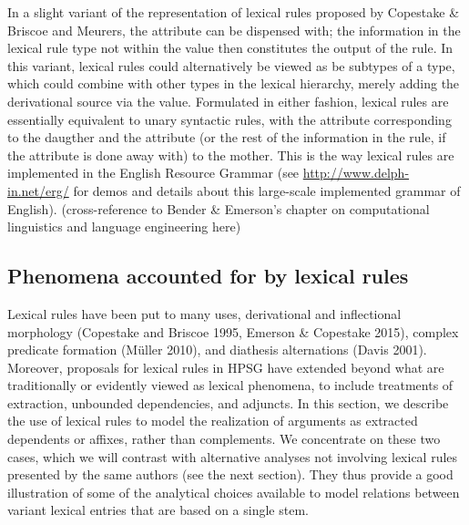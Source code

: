 \documentclass[output=paper]{langsci/langscibook}
\begin{document}
In a slight variant of the representation of lexical rules proposed by Copestake \& Briscoe and Meurers, the  attribute can be dispensed with; the information in the lexical rule type not within the  value then constitutes the output of the rule.
In this variant, lexical rules could alternatively be viewed as be subtypes of a  type, which could combine with other types in the lexical hierarchy, merely adding the derivational source via the  value. 
Formulated in either fashion, lexical rules are essentially equivalent to unary syntactic rules, with the  attribute corresponding to the daugther and the  attribute (or the rest of the information in the rule, if the  attribute is done away with) to the mother. This is the way lexical rules are implemented in the English Resource Grammar (see \url{http://www.delph-in.net/erg/} for demos and details about this large-scale implemented grammar of English). (cross-reference to Bender \& Emerson's chapter on computational linguistics and language engineering here)


	\subsection{Phenomena accounted for by lexical rules}

Lexical rules have been put to many uses, derivational and inflectional morphology (Copestake and Briscoe 1995, Emerson \& Copestake 2015), complex predicate formation (Müller 2010), and diathesis alternations (Davis 2001). Moreover, proposals for lexical rules in HPSG have extended beyond what are traditionally or evidently viewed as lexical phenomena, to include treatments of extraction, unbounded dependencies, and adjuncts. In this section, we describe the use of lexical rules to model the realization of arguments as extracted dependents or affixes, rather than complements. We concentrate on these two cases, which we will contrast with alternative analyses not involving lexical rules presented by the same authors (see the next section). They thus provide a good illustration of some of the analytical choices available to model relations between variant lexical entries that are based on a single stem. 
\end{document}
